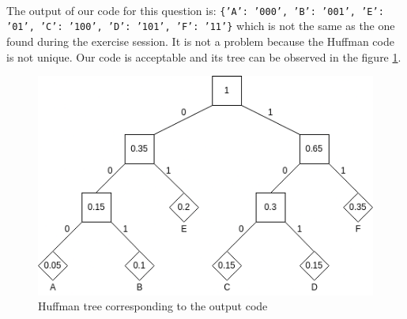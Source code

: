 \documentclass[a4paper, 11pt, oneside]{article}
\begin{document}
\paragraph{}The output of our code for this question is: \texttt{\{'A': '000', 'B': '001', 'E': '01', 'C': '100', 'D': '101', 'F': '11'\}} which is not
the same as the one found during the exercise session. It is not a problem because the Huffman code is not unique. Our code is acceptable and its tree can be observed in the figure \ref{fig:huffman_tree}.

\begin{figure}[H]
    \center
    \includegraphics[scale=0.7]{huffman_tree.png}
    \caption{Huffman tree corresponding to the output code}
    \label{fig:huffman_tree}
    \end{figure}
\end{document}
